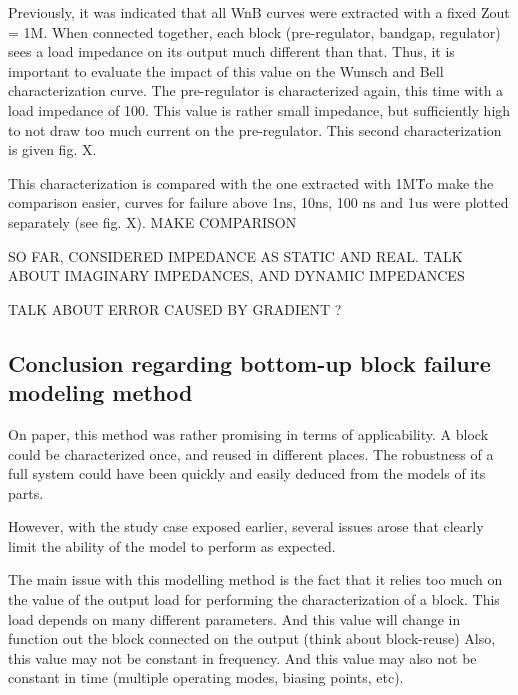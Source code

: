 
Previously, it was indicated that all WnB curves were extracted with a fixed Zout = 1M\textOmega.
When connected together, each block (pre-regulator, bandgap, regulator) sees a load impedance on its output much different than that.
Thus, it is important to evaluate the impact of this value on the Wunsch and Bell characterization curve.
The pre-regulator is characterized again, this time with a load impedance of 100\textOmega.
This value is rather small impedance, but sufficiently high to not draw too much current on the pre-regulator.
This second characterization is given fig. X.


This characterization is compared with the one extracted with 1M\textOmega\.
To make the comparison easier, curves for failure above 1ns, 10ns, 100 ns and 1us were plotted separately (see fig. X).
MAKE COMPARISON


SO FAR, CONSIDERED IMPEDANCE AS STATIC AND REAL.
TALK ABOUT IMAGINARY IMPEDANCES, AND DYNAMIC IMPEDANCES

TALK ABOUT ERROR CAUSED BY GRADIENT ?


\subsection{Conclusion regarding bottom-up block failure modeling method}

On paper, this method was rather promising in terms of applicability.
A block could be characterized once, and reused in different places.
The robustness of a full system could have been quickly and easily deduced from the models of its parts.

However, with the study case exposed earlier, several issues arose that clearly limit the ability of the model to perform as expected.

The main issue with this modelling method is the fact that it relies too much
on the value of the output load for performing the characterization of a block.
This load depends on many different parameters.
And this value will change in function out the block connected on the output (think about block-reuse)
Also, this value may not be constant in frequency.
And this value may also not be constant in time (multiple operating modes, biasing points, etc).

